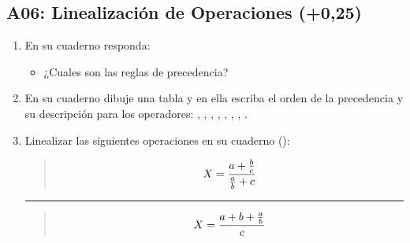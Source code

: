\documentclass[letterpaper,10pt,spanish]{sphinxmanual}
\begin{document}
\subsection{A06: Linealización de Operaciones (+0,25)}
\label{\detokenize{1_guias/10programacion/G1025:a06-linealizacion-de-operaciones-0-25}}
\sphinxAtStartPar
{}
\begin{enumerate}
%
\item {} 
\sphinxAtStartPar
En su cuaderno responda:
\begin{itemize}
\item {} 
\sphinxAtStartPar
¿Cuales son las reglas de precedencia?

\end{itemize}

\item {} 
\sphinxAtStartPar
En su cuaderno dibuje una tabla y en ella escriba el orden de la precedencia y su descripción para los operadores: \sphinxcode{\sphinxupquote{()}}, \sphinxcode{\sphinxupquote{*}}, \sphinxcode{\sphinxupquote{**}}, \sphinxcode{\sphinxupquote{/}}, \sphinxcode{\sphinxupquote{//}}, \sphinxcode{\sphinxupquote{\%}}, \sphinxcode{\sphinxupquote{+}}, \sphinxcode{\sphinxupquote{\sphinxhyphen{}}}.

\item {} 
\sphinxAtStartPar
Linealizar las siguientes operaciones en su cuaderno ():

\sphinxAtStartPar
{}
\begin{quote}
\begin{equation*}
\begin{split} X = { a + \frac{b}{c} \over {a \over b} + c } \end{split}
\end{equation*}\end{quote}


\bigskip\hrule\bigskip


\sphinxAtStartPar
{}
\begin{quote}
\begin{equation*}
\begin{split} X = { a + b + { a \over b } \over c }  \end{split}
\end{equation*}\end{quote}



\end{enumerate}
\end{document}
